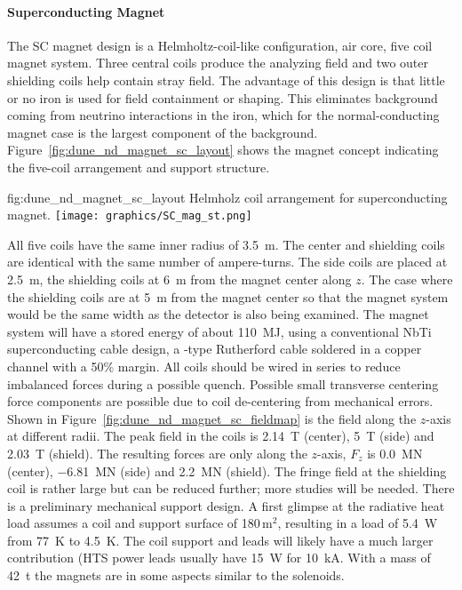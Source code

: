 \paragraph{Superconducting Magnet}
%
The SC magnet design is a Helmholtz-coil-like configuration, air core,  five coil magnet system. Three central coils produce the analyzing field and two outer shielding coils help contain stray field. The advantage of this design is that little or no iron is used for field containment or shaping. This eliminates background coming from neutrino interactions in the iron, which for the normal-conducting magnet case is the largest component of the background. Figure~\ref{fig:dune_nd_magnet_sc_layout} shows the magnet concept indicating the five-coil arrangement and support structure. 
%
%
\begin{dunefigure}{fig:dune_nd_magnet_sc_layout}
{Helmholz coil arrangement for  superconducting magnet.}
\texttt{[image: graphics/SC\_mag\_st.png]}
\end{dunefigure}
%
All five coils have the same inner radius of \SI{3.5}{m}. The center and shielding coils are identical with the same number of ampere-turns. The side coils are placed at \SI{2.5}{m}, the shielding coils at \SI{6}{m} from the magnet center along $z$.  The case where the shielding coils are at \SI{5}{m} from the magnet center so that the magnet system would be the same width as the   detector is also being examined.  The magnet system will have a stored energy of about \SI{110}{MJ}, using a conventional NbTi superconducting cable design, a -type Rutherford cable soldered in a copper channel with a 50\% margin. All coils should be wired in series to reduce imbalanced forces during a possible quench. Possible small transverse centering force components are possible due to coil de-centering from mechanical errors. 
%
Shown in Figure~\ref{fig:dune_nd_magnet_sc_fieldmap} is the field along the $z$-axis at different radii. The peak field in the coils is \SI{2.14}{T} (center), \SI{5}{T} (side) and \SI{2.03}{T} (shield). The resulting forces are only along the $z$-axis, $F_{z}$ is \SI{0.0}{MN} (center), \SI{-6.81}{MN} (side) and \SI{2.2}{MN} (shield). The fringe field at the shielding coil is rather large but can be reduced further; more studies will be needed. There is a preliminary mechanical support design. A first glimpse at the radiative heat load assumes a coil and support surface of 180\,m$^{2}$, resulting in a load of \SI{5.4}{W} from \SI{77}{K} to \SI{4.5}{K}. The coil support and leads will likely have a much larger contribution (HTS power leads usually have \SI{15}{W} for \SI{10}{kA}. With a mass of \SI{42}{t} the magnets are in some aspects similar to the  solenoids.
